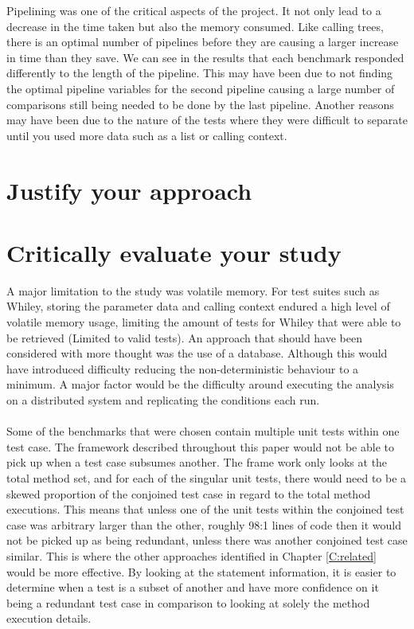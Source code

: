 Pipelining was one of the critical aspects of the project. It not only lead to a decrease in the time taken but also the memory consumed. Like calling trees, there is an optimal number of pipelines before they are causing a larger increase in time than they save. We can see in the results that each  benchmark responded differently to the length of the pipeline. This may have been due to not finding the optimal pipeline variables for the second pipeline causing a large number of comparisons still being needed to be done by the last pipeline. Another reasons may have been due to the nature of the tests where they were difficult to separate until you used more data such as a list or calling context. 


\section{Justify your approach}



\section{Critically evaluate your study}
\label{sec:crit}
A major limitation to the study was volatile memory. For test suites such as Whiley, storing the parameter data and calling context endured a high level of volatile memory usage, limiting the amount of tests for Whiley that were able to be retrieved (Limited to valid tests). An approach that should have been considered with more thought was the use of a database. Although this would have introduced difficulty reducing the non-deterministic behaviour to a minimum. A major factor would be the difficulty around executing the analysis on a distributed system and replicating the conditions each run.
\paragraph{}
Some of the benchmarks that were chosen contain multiple unit tests within one test case. The framework described throughout this paper would not be able to pick up when a test case subsumes another. The frame work only looks at the total method set, and for each of the singular unit tests, there would need to be a skewed proportion of the conjoined test case in regard to the total method executions. This means that unless one of the unit tests within the conjoined test case was arbitrary larger than the other, roughly 98:1 lines of code then it would not be picked up as being redundant, unless there was another conjoined test case similar. This is where the other approaches identified in Chapter \ref{C:related} would be more effective. By looking at the statement information, it is easier to determine when a test is a subset of another and have more confidence on it being a redundant test case in comparison to looking at solely the method execution details. 
